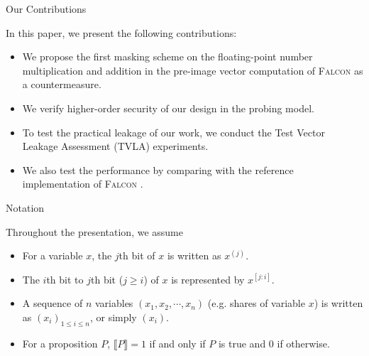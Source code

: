 \begin{frame}{Our Contributions}

In this paper, we present the following contributions:
\pause
\begin{itemize}
    \item We propose the first masking scheme on the floating-point number multiplication and addition in the pre-image vector computation of \textsc{Falcon} as a countermeasure.
    \pause
    \item We verify higher-order security of our design in the probing model.
    \pause
    \item To test the practical leakage of our work, we conduct the Test Vector Leakage Assessment (TVLA) \cite{gilbert2011testing} experiments.
    \pause
    \item We also test the performance by comparing with the reference implementation of \textsc{Falcon} \cite{NISTPQC-R3:FALCON20}.
\end{itemize}


\end{frame}


\begin{frame}{Notation}

Throughout the presentation, we assume
\pause
\begin{itemize}
    \item For a variable $x$, the $j$th bit of $x$ is written as $x^{(j)}$.
    \pause
    \item The $i$th bit to $j$th bit ($j \geq i$) of $x$ is represented by $x^{[j:i]}$.
    \pause
    \item A sequence of $n$ variables $(x_1, x_2, \cdots, x_n)$ (e.g. shares of variable $x$) is written as $(x_i)_{1 \leq i \leq n}$, or simply $(x_i)$.
    \pause
    \item For a proposition $P$, $\llbracket P \rrbracket = 1$ if and only if $P$ is true and $0$ if otherwise.
\end{itemize}
    
\end{frame}
